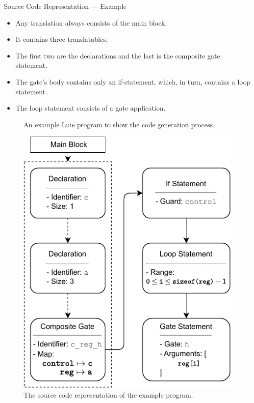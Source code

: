 \begin{frame}{Source Code Representation --- Example}
    \begin{minipage}{.60\textwidth}
        \begin{itemize}
            \item Any translation always consists of the main block.
            \item It contains three translatables.
            \item The first two are the declarations and the last is the composite gate statement.
            \item The gate's body contains only an if-statement, which, in turn, contains a loop statement.
            \item The loop statement consists of a gate application. 
        \end{itemize}   
        \hfill
        \begin{figure}
            \centering
            
            \caption{An example Luie program to show the code generation process.}
        \end{figure} 
    \end{minipage}
    \begin{minipage}{.35\textwidth}
        \centering
        \begin{figure}[htp]
            \centering
            \includegraphics[]{../figures/drawio/codeGen_sourceCode_example.pdf}
            \caption{The source code representation of the example program.}
        \end{figure}
    \end{minipage}
\end{frame}


